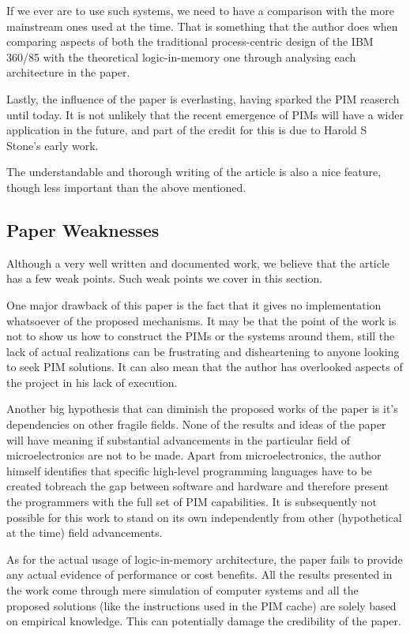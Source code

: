 \documentclass[12pt,twocolumn]{IEEEtran}
\begin{document}
If we ever are to use such systems, we need to have a comparison with the more mainstream ones used at the time. That is something that the author does when comparing aspects of both the traditional process-centric design of the IBM 360/85 with the theoretical logic-in-memory one through analysing each architecture in the paper. 

Lastly, the influence of the paper is everlasting, having sparked the PIM reaserch until today. It is not unlikely that the recent emergence of PIMs will have a wider application in the future, and part of the credit for this is due to Harold S Stone's early work.

The understandable and thorough writing of the article is also a nice feature, though less important than the above mentioned.

\subsection{Paper Weaknesses}
Although a very well written and documented work, we believe that the article has a few weak points. Such weak points we cover in this section.

One major drawback of this paper is the fact that it gives no implementation whatsoever of the proposed mechanisms. It may be that the point of the work is not to show us how to construct the PIMs or the systems around them, still the lack of actual realizations can be frustrating and disheartening to anyone looking to seek PIM solutions. It can also mean that the author has overlooked aspects of the project in his lack of execution.

Another big hypothesis that can diminish the proposed works of the paper is it's dependencies on other fragile fields. None of the results and ideas of the paper will have meaning if substantial advancements in the particular field of microelectronics are not to be made. Apart from microelectronics, the author himself identifies that specific high-level programming languages have to be created tobreach the gap between software and hardware and therefore present the programmers with the full set of PIM capabilities. It is subsequently not possible for this work to stand on its own independently from other (hypothetical at the time) field advancements.

As for the actual usage of logic-in-memory architecture, the paper fails to provide any actual evidence of performance or cost benefits. All the results presented in the work come through mere simulation of computer systems and all the proposed solutions (like the instructions used in the PIM cache) are solely based on empirical knowledge. This can potentially damage the credibility of the paper.
\end{document}
